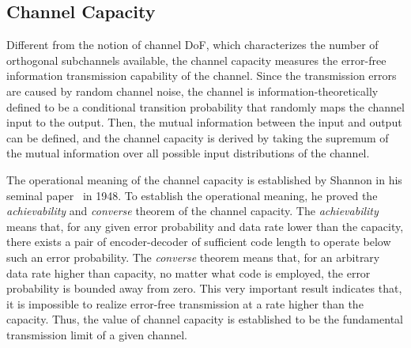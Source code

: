 \documentclass[journal,twocolumn]{IEEEtran}
\begin{document}
\subsection{Channel Capacity}
\label{Sec_2_Subsec_2}
Different from the notion of channel DoF, which characterizes the number of orthogonal subchannels available, the channel capacity measures the error-free information transmission capability of the channel. 
Since the transmission errors are caused by random channel noise, the channel is information-theoretically defined to be a conditional transition probability that randomly maps the channel input to the output. 
Then, the mutual information between the input and output can be defined, and the channel capacity is derived by taking the supremum of the mutual information over all possible input distributions of the channel. 

The operational meaning of the channel capacity is established by Shannon in his seminal paper~\cite{shannon1948mathematical} in 1948. To establish the operational meaning, he proved the {\it achievability} and {\it converse} theorem of the channel capacity. The {\it achievability} means that, for any given error probability and data rate lower than the capacity, there exists a pair of encoder-decoder of sufficient code length to operate below such an error probability. 
The {\it converse} theorem means that, for an arbitrary data rate higher than capacity, no matter what code is employed, the error probability is bounded away from zero. This very important result indicates that, it is impossible to realize error-free transmission at a rate higher than the capacity. Thus, the value of channel capacity is established to be the fundamental transmission limit of a given channel. 
\end{document}
